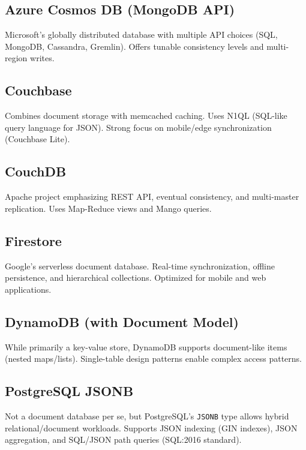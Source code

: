\documentclass[12pt,a4paper]{article}
\begin{document}
\subsection{Azure Cosmos DB (MongoDB API)}

Microsoft's globally distributed database with multiple API choices (SQL, MongoDB, Cassandra, Gremlin). Offers tunable consistency levels and multi-region writes.

\subsection{Couchbase}

Combines document storage with memcached caching. Uses N1QL (SQL-like query language for JSON). Strong focus on mobile/edge synchronization (Couchbase Lite).

\subsection{CouchDB}

Apache project emphasizing REST API, eventual consistency, and multi-master replication. Uses Map-Reduce views and Mango queries.

\subsection{Firestore}

Google's serverless document database. Real-time synchronization, offline persistence, and hierarchical collections. Optimized for mobile and web applications.

\subsection{DynamoDB (with Document Model)}

While primarily a key-value store, DynamoDB supports document-like items (nested maps/lists). Single-table design patterns enable complex access patterns.

\subsection{PostgreSQL JSONB}

Not a document database per se, but PostgreSQL's \texttt{JSONB} type allows hybrid relational/document workloads. Supports JSON indexing (GIN indexes), JSON aggregation, and SQL/JSON path queries (SQL:2016 standard).
\end{document}
